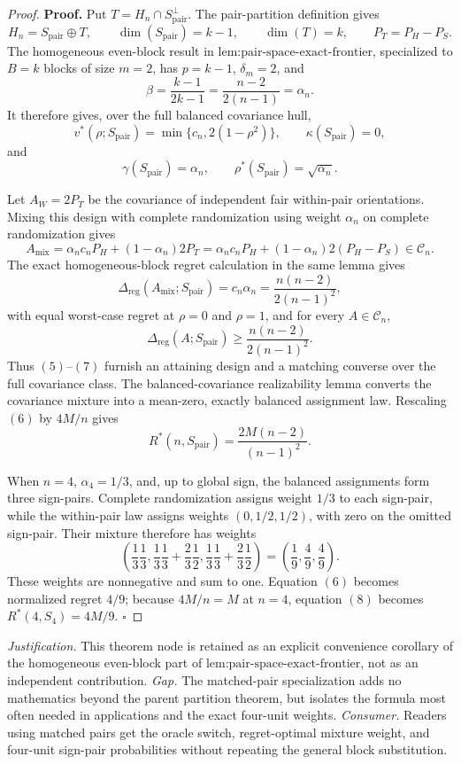 \documentclass{article}
\begin{document}
\begin{proof}
\textbf{Proof.}
Put \(T=H_n\cap S_{\mathrm{pair}}^\perp\).  The pair-partition definition gives
\[
H_n=S_{\mathrm{pair}}\mathbin\oplus T,
\qquad
\dim(S_{\mathrm{pair}})=k-1,
\qquad
\dim(T)=k,
\qquad
P_T=P_H-P_S.
\tag{1}
\]
The homogeneous even-block result in \(\text{lem:pair-space-exact-frontier}\), specialized to \(B=k\) blocks of size \(m=2\), has \(p=k-1\), \(\delta_m=2\), and
\[
\beta=\frac{k-1}{2k-1}
=\frac{n-2}{2(n-1)}=\alpha_n.
\tag{2}
\]
It therefore gives, over the full balanced covariance hull,
\[
v^*(\rho;S_{\mathrm{pair}})
=\min\{c_n,2(1-\rho^2)\},
\qquad
\kappa(S_{\mathrm{pair}})=0,
\tag{3}
\]
and
\[
\gamma(S_{\mathrm{pair}})=\alpha_n,
\qquad
\rho^*(S_{\mathrm{pair}})=\sqrt{\alpha_n}.
\tag{4}
\]

Let \(A_W=2P_T\) be the covariance of independent fair within-pair orientations.  Mixing this design with complete randomization using weight \(\alpha_n\) on complete randomization gives
\[
A_{\mathrm{mix}}
=\alpha_nc_nP_H+(1-\alpha_n)2P_T
=\alpha_nc_nP_H+(1-\alpha_n)2(P_H-P_S)
\in\mathcal C_n.
\tag{5}
\]
The exact homogeneous-block regret calculation in the same lemma gives
\[
\Delta_{\mathrm{reg}}(A_{\mathrm{mix}};S_{\mathrm{pair}})
=c_n\alpha_n
=\frac{n(n-2)}{2(n-1)^2},
\tag{6}
\]
with equal worst-case regret at \(\rho=0\) and \(\rho=1\), and for every \(A\in\mathcal C_n\),
\[
\Delta_{\mathrm{reg}}(A;S_{\mathrm{pair}})
\geq\frac{n(n-2)}{2(n-1)^2}.
\tag{7}
\]
Thus \((5)\)--\((7)\) furnish an attaining design and a matching converse over the full covariance class.  The balanced-covariance realizability lemma converts the covariance mixture into a mean-zero, exactly balanced assignment law.  Rescaling \((6)\) by \(4M/n\) gives
\[
R^*(n,S_{\mathrm{pair}})
=\frac{2M(n-2)}{(n-1)^2}.
\tag{8}
\]

When \(n=4\), \(\alpha_4=1/3\), and, up to global sign, the balanced assignments form three sign-pairs.  Complete randomization assigns weight \(1/3\) to each sign-pair, while the within-pair law assigns weights \((0,1/2,1/2)\), with zero on the omitted sign-pair.  Their mixture therefore has weights
\[
\left(
\frac13\frac13,
\frac13\frac13+\frac23\frac12,
\frac13\frac13+\frac23\frac12
\right)
=\left(\frac19,\frac49,\frac49\right).
\tag{9}
\]
These weights are nonnegative and sum to one.  Equation \((6)\) becomes normalized regret \(4/9\); because \(4M/n=M\) at \(n=4\), equation \((8)\) becomes \(R^*(4,S_4)=4M/9\). \(\square\)
\end{proof}
\par\smallskip\noindent \textit{Justification.} This theorem node is retained as an explicit convenience corollary of the homogeneous even-block part of \(\text{lem:pair-space-exact-frontier}\), not as an independent contribution. \textit{Gap.} The matched-pair specialization adds no mathematics beyond the parent partition theorem, but isolates the formula most often needed in applications and the exact four-unit weights. \textit{Consumer.} Readers using matched pairs get the oracle switch, regret-optimal mixture weight, and four-unit sign-pair probabilities without repeating the general block substitution.
\end{document}
